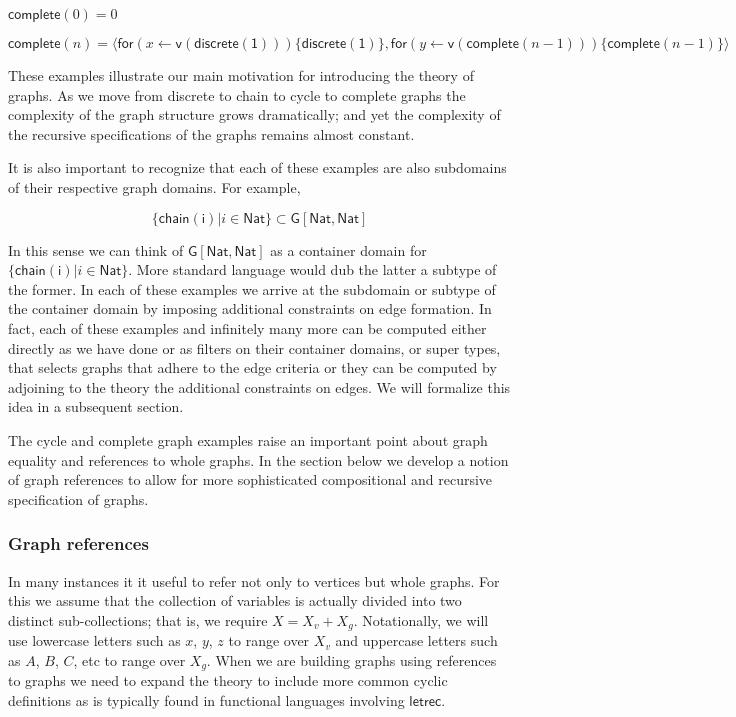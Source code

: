 \documentclass[12pt]{llncs}
\begin{document}
\(\mathsf{complete}(0) = 0\)

\(\mathsf{complete}(n) = \langle \mathsf{for} ( x \leftarrow \mathsf{v}(\mathsf{discrete(1)}))\{ \mathsf{discrete(1)} \}, \mathsf{for} ( y \leftarrow \mathsf{v}(\mathsf{complete}(n-1)))\{ \mathsf{complete}(n-1) \} \rangle\)

These examples illustrate our main motivation for introducing the theory
of graphs. As we move from discrete to chain to cycle to complete graphs
the complexity of the graph structure grows dramatically; and yet the
complexity of the recursive specifications of the graphs remains almost
constant.

It is also important to recognize that each of these examples are also
subdomains of their respective graph domains. For example,

\[\{ \mathsf{chain(i)} | i \in \mathsf{Nat}\} \subset \mathsf{G}[\mathsf{Nat},\mathsf{Nat}]\]

In this sense we can think of \(\mathsf{G}[\mathsf{Nat},\mathsf{Nat}]\)
as a container domain for
\(\{ \mathsf{chain(i)} | i \in \mathsf{Nat}\}\). More standard language
would dub the latter a subtype of the former. In each of these examples
we arrive at the subdomain or subtype of the container domain by
imposing additional constraints on edge formation. In fact, each of
these examples and infinitely many more can be computed either directly
as we have done or as filters on their container domains, or super
types, that selects graphs that adhere to the edge criteria or they can
be computed by adjoining to the theory the additional constraints on
edges. We will formalize this idea in a subsequent section.

The cycle and complete graph examples raise an important point about
graph equality and references to whole graphs. In the section below we
develop a notion of graph references to allow for more sophisticated
compositional and recursive specification of graphs.

\hypertarget{graph-references}{%
\subsubsection{Graph references}\label{graph-references}}

In many instances it it useful to refer not only to vertices but whole
graphs. For this we assume that the collection of variables is actually
divided into two distinct sub-collections; that is, we require
\(X = X_v + X_g\). Notationally, we will use lowercase letters such as
\(x\), \(y\), \(z\) to range over \(X_v\) and uppercase letters such as
\(A\), \(B\), \(C\), etc to range over \(X_g\). When we are building
graphs using references to graphs we need to expand the theory to
include more common cyclic definitions as is typically found in
functional languages involving \(\mathsf{letrec}\).
\end{document}
